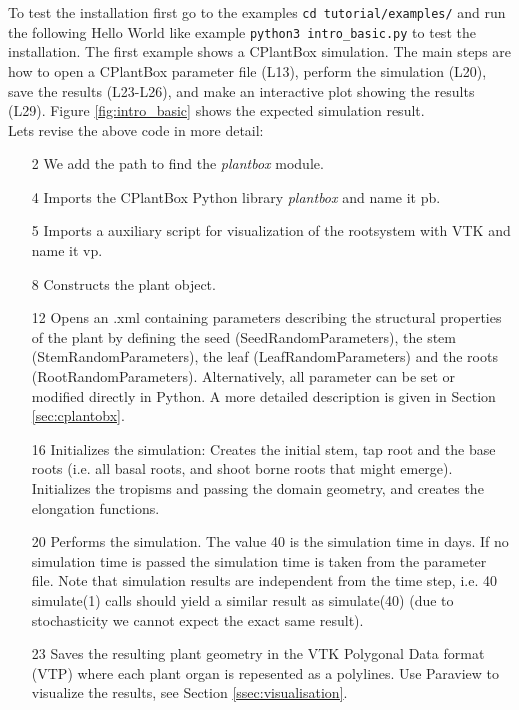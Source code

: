 To test the installation first go to the examples \lstinline{cd tutorial/examples/} and run the following Hello World like example \lstinline{python3 intro_basic.py} to test the installation. The first example shows a CPlantBox simulation. The main steps are how to open a CPlantBox parameter file (L13), perform the simulation (L20), save the results (L23-L26), and make an interactive plot showing the results (L29). Figure \ref{fig:intro_basic} shows the expected simulation result.  \\

 

\noindent 
Lets revise the above code in more detail: 
\begin{itemize}
 \item[2] We add the path to find the \emph{plantbox} module.
 \item[4] Imports the CPlantBox Python library \emph{plantbox} and name it pb.
 \item[5] Imports a auxiliary script for visualization of the rootsystem with VTK and name it vp.
 \item[8] Constructs the plant object.
 \item[12] Opens an .xml containing parameters describing the structural properties of the plant by defining the seed (SeedRandomParameters), the stem (StemRandomParameters), the leaf (LeafRandomParameters) and the roots (RootRandomParameters). Alternatively, all parameter can be set or modified directly in Python. A more detailed description is given in Section \ref{sec:cplantobx}.
 \item[16] Initializes the simulation: Creates the initial stem, tap root and the base roots
 (i.e. all basal roots, and shoot borne roots that might emerge). Initializes the tropisms and passing the domain geometry, 
 and creates the elongation functions. 
 \item[20] Performs the simulation. The value 40 is the simulation time in days. If no simulation time is passed the simulation time is taken from the parameter file. Note that simulation results are independent from the time step, i.e. 40 simulate(1) calls should yield a similar result 
 as simulate(40) (due to stochasticity we cannot expect the exact same result). 
 \item[23] Saves the resulting plant geometry in the VTK Polygonal Data format (VTP) where each plant organ is repesented as a polylines. Use Paraview to visualize the results, see Section \ref{ssec:visualisation}.

\end{itemize}
